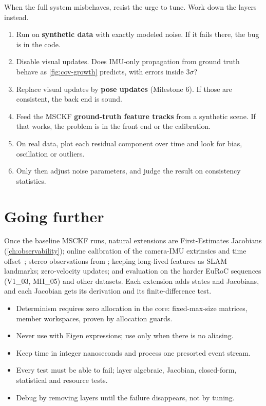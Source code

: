 When the full system misbehaves, resist the urge to tune. Work down the layers instead.
\begin{enumerate}
  \item Run on \textbf{synthetic data} with exactly modeled noise. If it fails there, the bug is in the code.
  \item Disable visual updates. Does IMU-only propagation from ground truth behave as \cref{fig:cov-growth} predicts, with errors
        inside $3\sigma$?
  \item Replace visual updates by \textbf{pose updates} (Milestone 6). If those are consistent, the back end is sound.
  \item Feed the MSCKF \textbf{ground-truth feature tracks} from a synthetic scene. If that works, the problem is in the front end or the
        calibration.
  \item On real data, plot each residual component over time and look for bias, oscillation or outliers.
  \item Only then adjust noise parameters, and judge the result on consistency statistics.
\end{enumerate}

\section{Going further}

Once the baseline MSCKF runs, natural extensions are First-Estimates Jacobians (\cref{ch:observability}); online calibration of the
camera-IMU extrinsics and time offset~\cite{li2013msckf2, li2014timeoffset}; stereo observations from ; keeping long-lived
features as SLAM landmarks; zero-velocity updates; and evaluation on the harder EuRoC sequences (V1\_03, MH\_05) and other
datasets. Each extension adds states and Jacobians, and each Jacobian gets its derivation and its finite-difference test.

\begin{takeaways}
\begin{itemize}
  \item Determinism requires zero allocation in the core: fixed-max-size matrices, member workspaces, proven by allocation guards.
  \item Never use  with Eigen expressions; use  only when there is no aliasing.
  \item Keep time in integer nanoseconds and process one presorted event stream.
  \item Every test must be able to fail; layer algebraic, Jacobian, closed-form, statistical and resource tests.
  \item Debug by removing layers until the failure disappears, not by tuning.
\end{itemize}
\end{takeaways}

